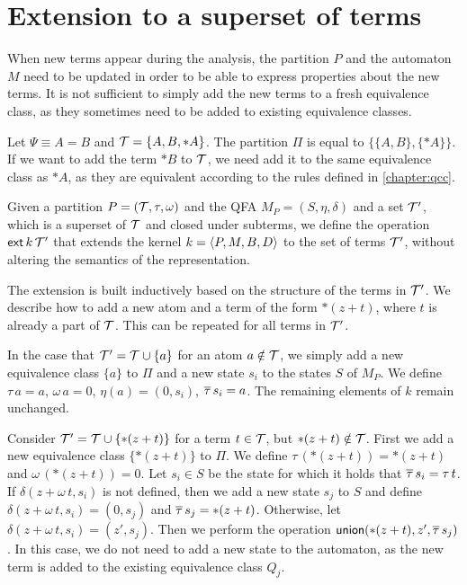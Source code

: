 \section{Extension to a superset of terms}

When new terms appear during the analysis, the partition $P$ and the automaton $M$ need to be updated
in order to be able to express properties about the new terms.
It is not sufficient to simply add the new terms to a fresh equivalence class,
as they sometimes need to be added to existing equivalence classes.

\begin{example}
    Let $\Psi \equiv A = B$ and $\mathcal{T} = \{A, B, *A\}$.
    The partition $\Pi$ is equal to $\{\{A, B\}, \{*A\}\}$.
    If we want to add the term $*B$ to $\mathcal{T}$, we need add it to the same equivalence class as $*A$,
    as they are equivalent according to the rules defined in \cref{chapter:qcc}.
\end{example}

Given a partition $P = (\mathcal{T}, \tau, \omega)$ and the QFA $M_P = (S, \eta, \delta)$ and a set $\mathcal{T}'$, which is a superset of $\mathcal{T}$ and closed under subterms,
we define the operation $\textsf{ext}\,{k}\,{\mathcal{T}'}$ that extends the kernel $k = \langle P, M, B, D\rangle$ to the set of terms $\mathcal{T}'$,
without altering the semantics of the representation.

The extension is built inductively based on the structure of the terms in $\mathcal{T}'$.
We describe how to add a new atom and a term of the form $*(z+t)$, where $t$ is already a part of $\mathcal{T}$.
This can be repeated for all terms in $\mathcal{T}'$.

In the case that $\mathcal{T}' = \mathcal{T} \cup \{a\}$ for an atom $a \notin \mathcal{T}$, we simply add a new
equivalence class $\{a\}$ to $\Pi$ and a new state $s_i$ to the states $S$ of $M_P$.
We define $\tau\,a = a$, $\omega\,a=0$, $\eta(a) = (0,s_i)$, $\overline{\tau}\,s_i = a$.
The remaining elements of $k$ remain unchanged.

Consider $\mathcal{T}' = \mathcal{T} \cup \{*(z+t)\}$ for a term $t \in \mathcal{T}$, but $*(z + t) \notin \mathcal{T}$.
First we add a new equivalence class $\{*(z+t)\}$ to $\Pi$.
We define $\tau\,(*(z+t)) = *(z+t)$ and $\omega\,(*(z+t))=0$.
Let $s_i \in S$ be the state for which it holds that $\overline{\tau}\,s_i = \tau\,t$.
If $\delta(z + \omega\,t,s_i)$ is not defined, then we add a new state $s_j$ to $S$
and define $\delta(z + \omega\,t, s_i) = (0, s_j)$ and $\overline{\tau}\,s_j = *(z+t)$.
Otherwise, let $\delta(z + \omega\,t, s_i) = (z', s_j)$.
Then we perform the operation $\textsf{union}(*(z + t), z', \overline{\tau}\,s_j)$.
In this case, we do not need to add a new state to the automaton,
as the new term is added to the existing equivalence class $Q_j$.
